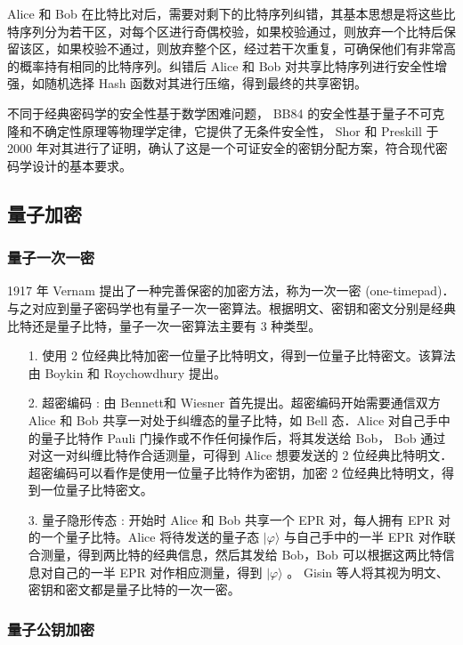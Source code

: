 Alice 和 Bob 在比特比对后，需要对剩下的比特序列纠错，其基本思想是将这些比特序列分为若干区，对每个区进行奇偶校验，如果校验通过，则放弃一个比特后保留该区，如果校验不通过，则放弃整个区，经过若干次重复，可确保他们有非常高的概率持有相同的比特序列。纠错后 Alice 和 Bob 对共享比特序列进行安全性增强，如随机选择 Hash 函数对其进行压缩，得到最终的共享密钥。

不同于经典密码学的安全性基于数学困难问题， BB84 的安全性基于量子不可克隆和不确定性原理等物理学定律，它提供了无条件安全性， Shor 和 Preskill 于 2000 年对其进行了证明，确认了这是一个可证安全的密钥分配方案，符合现代密码学设计的基本要求。


\subsection{量子加密}

\subsubsection{量子一次一密}

1917 年 Vernam 提出了一种完善保密的加密方法，称为一次一密 (one-timepad)．与之对应到量子密码学也有量子一次一密算法。根据明文、密钥和密文分别是经典比特还是量子比特，量子一次一密算法主要有 3 种类型。

\begin{itemize}
\item [1.] 使用 2 位经典比特加密一位量子比特明文，得到一位量子比特密文。该算法由 Boykin 和 Roychowdhury 提出。
\item [2.] 超密编码 : 由 Bennett和 Wiesner 首先提出。超密编码开始需要通信双方 Alice 和 Bob 共享一对处于纠缠态的量子比特，如 Bell 态．Alice 对自己手中的量子比特作 Pauli 门操作或不作任何操作后，将其发送给 Bob， Bob 通过对这一对纠缠比特作合适测量，可得到 Alice 想要发送的 2 位经典比特明文．超密编码可以看作是使用一位量子比特作为密钥，加密 2 位经典比特明文，得到一位量子比特密文。
\item [3.] 量子隐形传态 : 开始时 Alice 和 Bob 共享一个 EPR 对，每人拥有 EPR 对的一个量子比特。Alice 将待发送的量子态 $|\varphi\rangle$ 与自己手中的一半 EPR 对作联合测量，得到两比特的经典信息，然后其发给 Bob，Bob 可以根据这两比特信息对自己的一半 EPR 对作相应测量，得到 $|\varphi\rangle$ 。 Gisin 等人将其视为明文、密钥和密文都是量子比特的一次一密。
\end{itemize}

\subsubsection{量子公钥加密}

